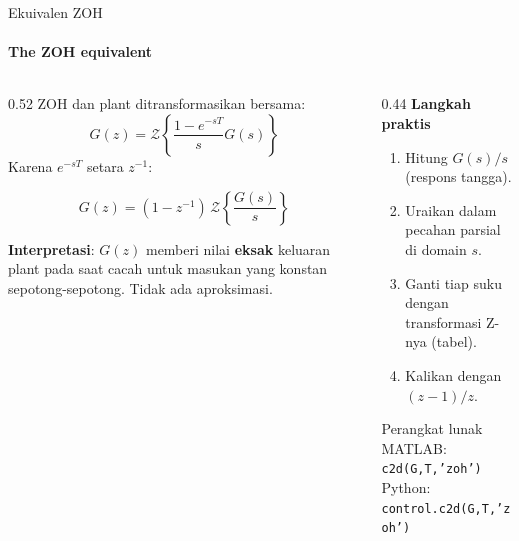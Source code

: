 \documentclass[aspectratio=169,10pt]{beamer}
\begin{document}
\begin{frame}{Ekuivalen ZOH}
	\framesubtitle{The ZOH equivalent}
	\begin{columns}[T]
		\begin{column}{0.52\textwidth}
			\small
			ZOH dan plant ditransformasikan bersama:
			\[
				G(z) = \mathcal{Z}\left\{\frac{1-e^{-sT}}{s}G(s)\right\}
			\]
			Karena $e^{-sT}$ setara $z^{-1}$:
			\begin{block}{}
				\[
					G(z) = (1 - z^{-1})\,\mathcal{Z}\left\{\frac{G(s)}{s}\right\}
				\]
			\end{block}
			\textbf{Interpretasi}: $G(z)$ memberi nilai \textbf{eksak} keluaran plant pada saat cacah untuk masukan yang konstan sepotong-sepotong. Tidak ada aproksimasi.
		\end{column}
		\begin{column}{0.44\textwidth}
			\small
			\textbf{Langkah praktis}
			\begin{enumerate}
				\item Hitung $G(s)/s$ (respons tangga).
				\item Uraikan dalam pecahan parsial di domain $s$.
				\item Ganti tiap suku dengan transformasi Z-nya (tabel).
				\item Kalikan dengan $(z-1)/z$.
			\end{enumerate}
			\vspace{0.1cm}
			\begin{block}{Perangkat lunak}
				\scriptsize
				MATLAB: \texttt{c2d(G,T,'zoh')}\\
				Python: \texttt{control.c2d(G,T,'zoh')}
			\end{block}
		\end{column}
	\end{columns}
\end{frame}
\end{document}
